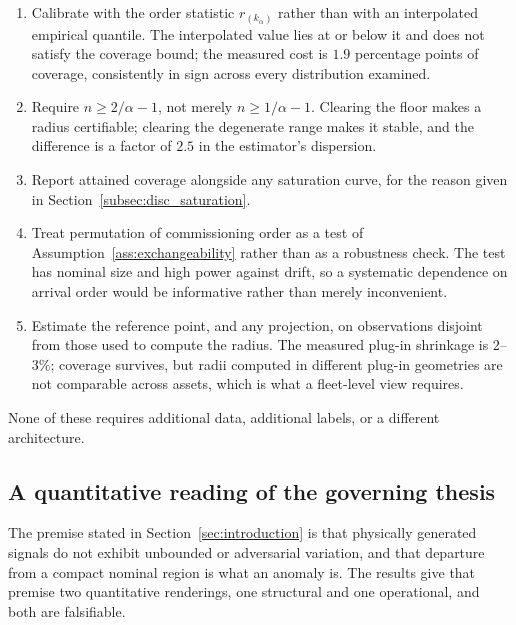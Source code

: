 \documentclass[a4paper]{cas-sc}
\newcommand{\residual}{\ensuremath{r}}
\begin{document}
\begin{enumerate}[leftmargin=1.8em]
\item Calibrate with the order statistic \(\residual_{(k_\alpha)}\) rather
      than with an interpolated empirical quantile. The interpolated value
      lies at or below it and does not satisfy the coverage bound; the
      measured cost is \(1.9\) percentage points of coverage, consistently in
      sign across every distribution examined.
\item Require \(n\ge 2/\alpha-1\), not merely \(n\ge 1/\alpha-1\). Clearing
      the floor makes a radius certifiable; clearing the degenerate range
      makes it stable, and the difference is a factor of \(2.5\) in the
      estimator's dispersion.
\item Report attained coverage alongside any saturation curve, for the reason
      given in Section~\ref{subsec:disc_saturation}.
\item Treat permutation of commissioning order as a test of
      Assumption~\ref{ass:exchangeability} rather than as a robustness check.
      The test has nominal size and high power against drift, so a systematic
      dependence on arrival order would be informative rather than merely
      inconvenient.
\item Estimate the reference point, and any projection, on observations
      disjoint from those used to compute the radius. The measured plug-in
      shrinkage is \(2\)--\(3\%\); coverage survives, but radii computed in
      different plug-in geometries are not comparable across assets, which is
      what a fleet-level view requires.
\end{enumerate}

None of these requires additional data, additional labels, or a different
architecture.

\subsection{A quantitative reading of the governing thesis}
\label{subsec:disc_synthesis}

The premise stated in Section~\ref{sec:introduction} is that physically
generated signals do not exhibit unbounded or adversarial variation, and that
departure from a compact nominal region is what an anomaly is. The results
give that premise two quantitative renderings, one structural and one
operational, and both are falsifiable.
\end{document}

